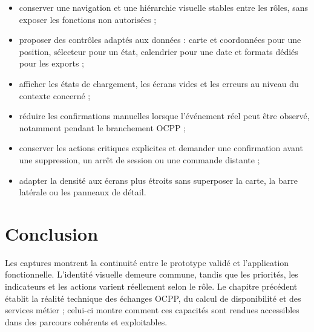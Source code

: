 \begin{itemize}[leftmargin=7mm]
  \item conserver une navigation et une hiérarchie visuelle stables entre les
  rôles, sans exposer les fonctions non autorisées ;
  \item proposer des contrôles adaptés aux données : carte et coordonnées pour
  une position, sélecteur pour un état, calendrier pour une date et formats
  dédiés pour les exports ;
  \item afficher les états de chargement, les écrans vides et les erreurs au
  niveau du contexte concerné ;
  \item réduire les confirmations manuelles lorsque l'événement réel peut être
  observé, notamment pendant le branchement OCPP ;
  \item conserver les actions critiques explicites et demander une confirmation
  avant une suppression, un arrêt de session ou une commande distante ;
  \item adapter la densité aux écrans plus étroits sans superposer la carte, la
  barre latérale ou les panneaux de détail.
\end{itemize}

\section*{Conclusion}

Les captures montrent la continuité entre le prototype validé et l'application
fonctionnelle. L'identité visuelle demeure commune, tandis que les priorités,
les indicateurs et les actions varient réellement selon le rôle. Le chapitre
précédent établit la réalité technique des échanges OCPP, du calcul de
disponibilité et des services métier ; celui-ci montre comment ces capacités
sont rendues accessibles dans des parcours cohérents et exploitables.
